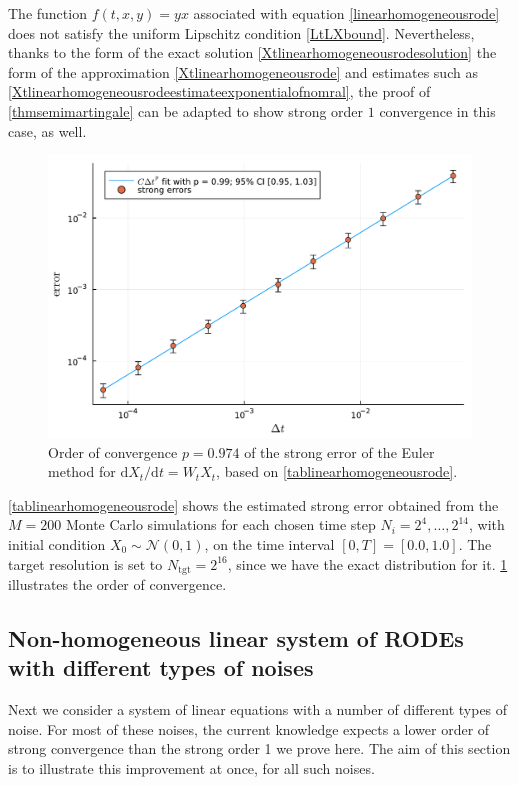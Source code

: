 \documentclass[reqno,12pt]{amsart}
\theoremstyle{plain} %
\theoremstyle{definition} %
\begin{document}
The function $f(t, x, y) = yx$ associated with equation \eqref{linearhomogeneousrode} does not satisfy the uniform Lipschitz condition \eqref{LtLXbound}. Nevertheless, thanks to the form of the exact solution \eqref{Xtlinearhomogeneousrodesolution} the form of the approximation \eqref{Xtlinearhomogeneousrode} and estimates such as \eqref{Xtlinearhomogeneousrodeestimateexponentialofnomral}, the proof of \cref{thmsemimartingale} can be adapted to show strong order $1$ convergence in this case, as well.

\begin{figure}[htb]
    \includegraphics[scale=0.6]{img/order_wiener_linearhomogenous.pdf}
    \caption{Order of convergence $p = 0.974$ of the strong error of the Euler method for $\mathrm{d}X_t/\mathrm{d}t = W_t X_t$, based on \cref{tablinearhomogeneousrode}.}
    \label{figlinearhomogeneousrode}
\end{figure}

\cref{tablinearhomogeneousrode} shows the estimated strong error obtained from the $M = 200$ Monte Carlo simulations for each chosen time step $N_i = 2^4, \ldots, 2^{14}$, with initial condition $X_0 \sim \mathcal{N}(0, 1)$, on the time interval $[0, T] = [0.0, 1.0]$. The target resolution is set to $N_{\textrm{tgt}} = 2^{16}$, since we have the exact distribution for it. \cref{figlinearhomogeneousrode} illustrates the order of convergence.

\subsection{Non-homogeneous linear system of RODEs with different types of noises}

Next we consider a system of linear equations with a number of different types of noise. For most of these noises, the current knowledge expects a lower order of strong convergence than the strong order 1 we prove here. The aim of this section is to illustrate this improvement at once, for all such noises.
\end{document}
